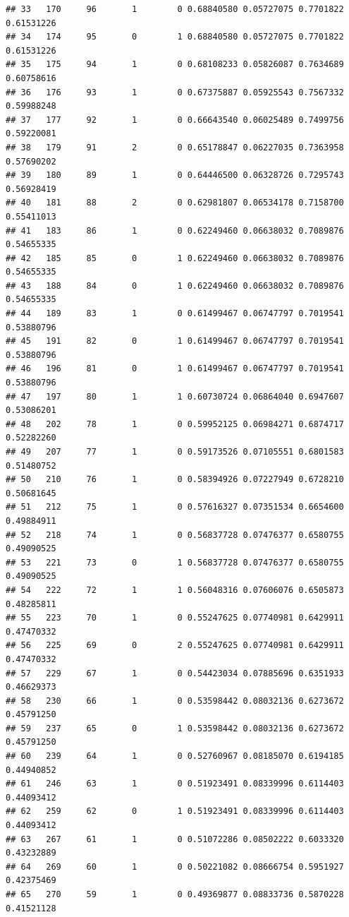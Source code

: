 \documentclass[
]{book}
\begin{document}
\begin{verbatim}
## 33   170     96       1        0 0.68840580 0.05727075 0.7701822 0.61531226
## 34   174     95       0        1 0.68840580 0.05727075 0.7701822 0.61531226
## 35   175     94       1        0 0.68108233 0.05826087 0.7634689 0.60758616
## 36   176     93       1        0 0.67375887 0.05925543 0.7567332 0.59988248
## 37   177     92       1        0 0.66643540 0.06025489 0.7499756 0.59220081
## 38   179     91       2        0 0.65178847 0.06227035 0.7363958 0.57690202
## 39   180     89       1        0 0.64446500 0.06328726 0.7295743 0.56928419
## 40   181     88       2        0 0.62981807 0.06534178 0.7158700 0.55411013
## 41   183     86       1        0 0.62249460 0.06638032 0.7089876 0.54655335
## 42   185     85       0        1 0.62249460 0.06638032 0.7089876 0.54655335
## 43   188     84       0        1 0.62249460 0.06638032 0.7089876 0.54655335
## 44   189     83       1        0 0.61499467 0.06747797 0.7019541 0.53880796
## 45   191     82       0        1 0.61499467 0.06747797 0.7019541 0.53880796
## 46   196     81       0        1 0.61499467 0.06747797 0.7019541 0.53880796
## 47   197     80       1        1 0.60730724 0.06864040 0.6947607 0.53086201
## 48   202     78       1        0 0.59952125 0.06984271 0.6874717 0.52282260
## 49   207     77       1        0 0.59173526 0.07105551 0.6801583 0.51480752
## 50   210     76       1        0 0.58394926 0.07227949 0.6728210 0.50681645
## 51   212     75       1        0 0.57616327 0.07351534 0.6654600 0.49884911
## 52   218     74       1        0 0.56837728 0.07476377 0.6580755 0.49090525
## 53   221     73       0        1 0.56837728 0.07476377 0.6580755 0.49090525
## 54   222     72       1        1 0.56048316 0.07606076 0.6505873 0.48285811
## 55   223     70       1        0 0.55247625 0.07740981 0.6429911 0.47470332
## 56   225     69       0        2 0.55247625 0.07740981 0.6429911 0.47470332
## 57   229     67       1        0 0.54423034 0.07885696 0.6351933 0.46629373
## 58   230     66       1        0 0.53598442 0.08032136 0.6273672 0.45791250
## 59   237     65       0        1 0.53598442 0.08032136 0.6273672 0.45791250
## 60   239     64       1        0 0.52760967 0.08185070 0.6194185 0.44940852
## 61   246     63       1        0 0.51923491 0.08339996 0.6114403 0.44093412
## 62   259     62       0        1 0.51923491 0.08339996 0.6114403 0.44093412
## 63   267     61       1        0 0.51072286 0.08502222 0.6033320 0.43232889
## 64   269     60       1        0 0.50221082 0.08666754 0.5951927 0.42375469
## 65   270     59       1        0 0.49369877 0.08833736 0.5870228 0.41521128

\end{verbatim}
\end{document}

